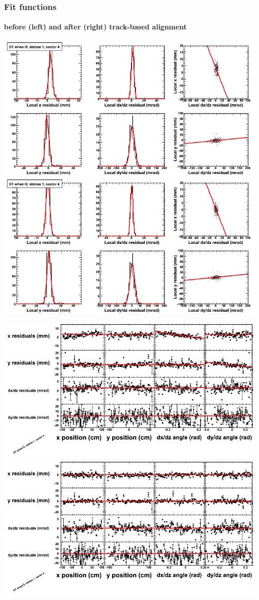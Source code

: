 \documentclass[compress]{beamer}
\begin{document}
\begin{frame}
\frametitle{Fit functions}
\framesubtitle{before (left) and after (right) track-based alignment}
\includegraphics[width=0.5\linewidth]{fitfunctions_re01/MBwhCst1sec04_bellcurves.png} \includegraphics[width=0.5\linewidth]{fitfunctions_re05/MBwhCst1sec04_bellcurves.png}

\includegraphics[width=0.5\linewidth]{fitfunctions_re01/MBwhCst1sec04_polynomials.png} \includegraphics[width=0.5\linewidth]{fitfunctions_re05/MBwhCst1sec04_polynomials.png}
\end{frame}
\end{document}
